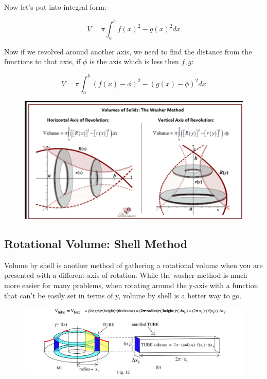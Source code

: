 Now let's put into integral form:

\begin{equation}
	V = \pi\int_a^b{f(x)^2-g(x)^2} dx
\end{equation}

Now if we revolved around another axis, we need to find the distance from the functions to that axis, if $\phi$ is the axis which is less then $f,g$: 

\begin{equation}
	V = \pi\int_a^b{(f(x)-\phi)^2-(g(x)-\phi)^2}dx
\end{equation}


\begin{figure}[H]
	\begin{center}
		\includegraphics[scale=0.30]{pages/images/washers}
		\label{fig:fig4}
	\end{center}
\end{figure}

\pagebreak

\subsection{Rotational Volume: Shell Method}
Volume by shell is another method of gathering a rotational volume when you are presented with a different axis of rotation. While the washer method is much more easier for many problems, when rotating around the y-axis with a function that can't be easily set in terms of y, volume by shell is a better way to go.

\begin{figure}[H]
	\begin{center}
		\includegraphics[scale=0.30]{pages/images/vshell}
		\label{fig:fig3}
	\end{center}
\end{figure}

